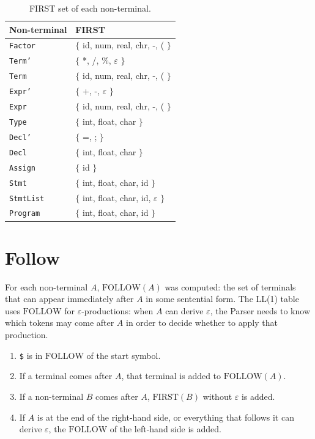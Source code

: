 \documentclass[12pt,letterpaper]{article}
\newcommand{\cod}[1]{\texttt{#1}} %
\newcommand{\anchotabla}{0.9\textwidth} %
\begin{document}
\begin{table}[H]
\centering
\renewcommand{\arraystretch}{1.2}
\begin{tabular}{@{}p{0.30\dimexpr\anchotabla} p{0.66\dimexpr\anchotabla}@{}}
\toprule
\textbf{Non-terminal} & \textbf{FIRST} \\
\midrule
\cod{Factor}   & $\{$ id, num, real, chr, -, ( $\}$ \\
\cod{Term'}    & $\{$ *, /, \%, $\varepsilon$ $\}$ \\
\cod{Term}     & $\{$ id, num, real, chr, -, ( $\}$ \\
\cod{Expr'}    & $\{$ +, -, $\varepsilon$ $\}$ \\
\cod{Expr}     & $\{$ id, num, real, chr, -, ( $\}$ \\
\cod{Type}     & $\{$ int, float, char $\}$ \\
\cod{Decl'}    & $\{$ =, ; $\}$ \\
\cod{Decl}     & $\{$ int, float, char $\}$ \\
\cod{Assign}   & $\{$ id $\}$ \\
\cod{Stmt}     & $\{$ int, float, char, id $\}$ \\
\cod{StmtList} & $\{$ int, float, char, id, $\varepsilon$ $\}$ \\
\cod{Program}  & $\{$ int, float, char, id $\}$ \\
\bottomrule
\end{tabular}
\caption{FIRST set of each non-terminal.}
\end{table}

\section{Follow}

For each non-terminal $A$, $\text{FOLLOW}(A)$ was computed: the set of terminals that can appear immediately after $A$ in some sentential form. The LL(1) table uses $\text{FOLLOW}$ for $\varepsilon$-productions: when $A$ can derive $\varepsilon$, the Parser needs to know which tokens may come after $A$ in order to decide whether to apply that production.

\begin{enumerate}
    \item \texttt{\$} is in $\text{FOLLOW}$ of the start symbol.
    \item If a terminal comes after $A$, that terminal is added to $\text{FOLLOW}(A)$.
    \item If a non-terminal $B$ comes after $A$, $\text{FIRST}(B)$ without $\varepsilon$ is added.
    \item If $A$ is at the end of the right-hand side, or everything that follows it can derive $\varepsilon$, the $\text{FOLLOW}$ of the left-hand side is added.
\end{enumerate}
\end{document}
